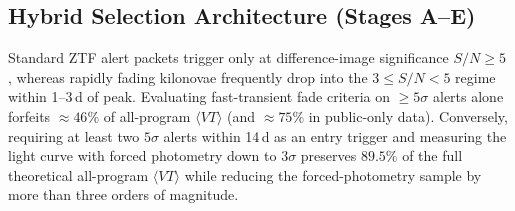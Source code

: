 \documentclass[twocolumn]{aastex631}
\newcommand{\vteff}{\langle VT\rangle}
\begin{document}
\subsection{Hybrid Selection Architecture (Stages A--E)}
Standard ZTF alert packets trigger only at difference-image significance $S/N \ge 5$ \citep{Masci2019}, whereas rapidly fading kilonovae frequently drop into the $3 \le S/N < 5$ regime within 1--3\,d of peak. Evaluating fast-transient fade criteria on $\ge 5\sigma$ alerts alone forfeits $\approx 46\%$ of all-program $\vteff$ (and $\approx 75\%$ in public-only data). Conversely, requiring at least two $5\sigma$ alerts within 14\,d as an entry trigger and measuring the light curve with forced photometry down to $3\sigma$ preserves $89.5\%$ of the full theoretical all-program $\vteff$ while reducing the forced-photometry sample by more than three orders of magnitude.
\end{document}
